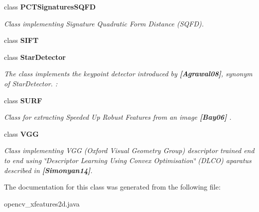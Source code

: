 \begin{DoxyCompactItemize}
class {\bfseries P\+C\+T\+Signatures\+S\+Q\+FD}
\begin{DoxyCompactList}\small\item\em Class implementing Signature Quadratic Form Distance (S\+Q\+FD). \end{DoxyCompactList}\item 
class {\bfseries S\+I\+FT}
\item 
class {\bfseries Star\+Detector}
\begin{DoxyCompactList}\small\item\em The class implements the keypoint detector introduced by {\bfseries [Agrawal08]}, synonym of Star\+Detector. \+: \end{DoxyCompactList}\item 
class {\bfseries S\+U\+RF}
\begin{DoxyCompactList}\small\item\em Class for extracting Speeded Up Robust Features from an image {\bfseries [Bay06]} . \end{DoxyCompactList}\item 
class {\bfseries V\+GG}
\begin{DoxyCompactList}\small\item\em Class implementing V\+GG (Oxford Visual Geometry Group) descriptor trained end to end using \char`\"{}\+Descriptor Learning Using Convex Optimisation\char`\"{} (D\+L\+CO) aparatus described in {\bfseries [Simonyan14]}. \end{DoxyCompactList}\end{DoxyCompactItemize}


The documentation for this class was generated from the following file\+:\begin{DoxyCompactItemize}
\item 
opencv\+\_\+xfeatures2d.\+java\end{DoxyCompactItemize}
